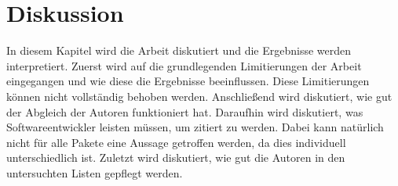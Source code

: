 
\chapter{Diskussion}
\label{chap:diskussion}
In diesem Kapitel wird die Arbeit diskutiert und die Ergebnisse werden interpretiert.
Zuerst wird auf die grundlegenden Limitierungen der Arbeit eingegangen und wie diese die Ergebnisse beeinflussen.
Diese Limitierungen können nicht vollständig behoben werden.
Anschließend wird diskutiert, wie gut der Abgleich der Autoren funktioniert hat.
Daraufhin wird diskutiert, was Softwareentwickler leisten müssen, um zitiert zu werden.
Dabei kann natürlich nicht für alle Pakete eine Aussage getroffen werden, da dies individuell unterschiedlich ist.
Zuletzt wird diskutiert, wie gut die Autoren in den untersuchten Listen gepflegt werden.

